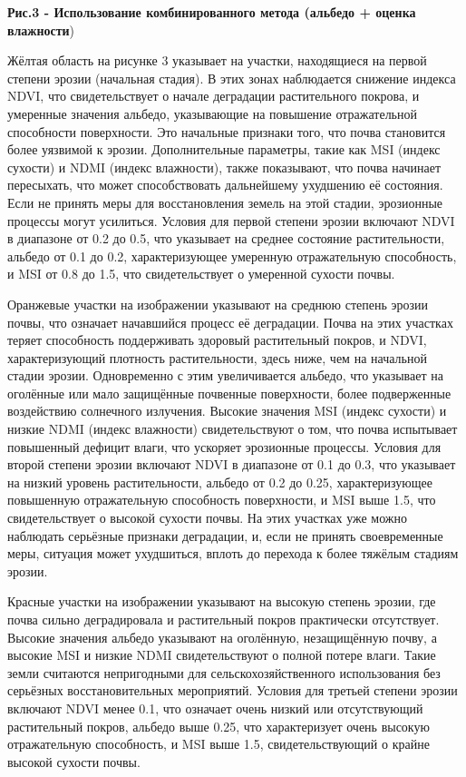 {\bfseries Рис.3 - Использование комбинированного метода (альбедо + оценка
влажности})

Жёлтая область на рисунке 3 указывает на участки, находящиеся на первой
степени эрозии (начальная стадия). В этих зонах наблюдается снижение
индекса NDVI, что свидетельствует о начале деградации растительного
покрова, и умеренные значения альбедо, указывающие на повышение
отражательной способности поверхности. Это начальные признаки того, что
почва становится более уязвимой к эрозии. Дополнительные параметры,
такие как MSI (индекс сухости) и NDMI (индекс влажности), также
показывают, что почва начинает пересыхать, что может способствовать
дальнейшему ухудшению её состояния. Если не принять меры для
восстановления земель на этой стадии, эрозионные процессы могут
усилиться. Условия для первой степени эрозии включают NDVI в диапазоне
от 0.2 до 0.5, что указывает на среднее состояние растительности,
альбедо от 0.1 до 0.2, характеризующее умеренную отражательную
способность, и MSI от 0.8 до 1.5, что свидетельствует о умеренной
сухости почвы.

Оранжевые участки на изображении указывают на среднюю степень эрозии
почвы, что означает начавшийся процесс её деградации. Почва на этих
участках теряет способность поддерживать здоровый растительный покров, и
NDVI, характеризующий плотность растительности, здесь ниже, чем на
начальной стадии эрозии. Одновременно с этим увеличивается альбедо, что
указывает на оголённые или мало защищённые почвенные поверхности, более
подверженные воздействию солнечного излучения. Высокие значения MSI
(индекс сухости) и низкие NDMI (индекс влажности) свидетельствуют о том,
что почва испытывает повышенный дефицит влаги, что ускоряет эрозионные
процессы. Условия для второй степени эрозии включают NDVI в диапазоне от
0.1 до 0.3, что указывает на низкий уровень растительности, альбедо от
0.2 до 0.25, характеризующее повышенную отражательную способность
поверхности, и MSI выше 1.5, что свидетельствует о высокой сухости
почвы. На этих участках уже можно наблюдать серьёзные признаки
деградации, и, если не принять своевременные меры, ситуация может
ухудшиться, вплоть до перехода к более тяжёлым стадиям эрозии.

Красные участки на изображении указывают на высокую степень эрозии, где
почва сильно деградировала и растительный покров практически
отсутствует. Высокие значения альбедо указывают на оголённую,
незащищённую почву, а высокие MSI и низкие NDMI свидетельствуют о полной
потере влаги. Такие земли считаются непригодными для
сельскохозяйственного использования без серьёзных восстановительных
мероприятий. Условия для третьей степени эрозии включают NDVI менее 0.1,
что означает очень низкий или отсутствующий растительный покров, альбедо
выше 0.25, что характеризует очень высокую отражательную способность, и
MSI выше 1.5, свидетельствующий о крайне высокой сухости почвы.

